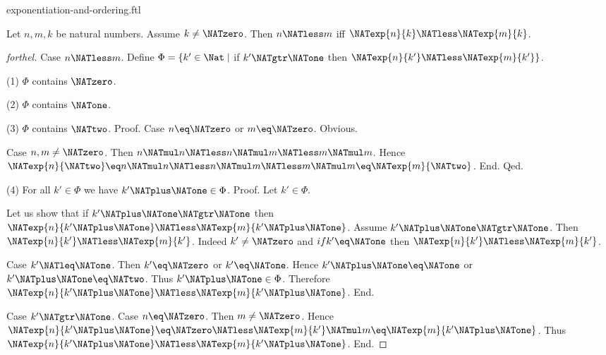 \documentclass{naproche-library}
\begin{document}
\begin{smodule}[title=Exponentiation and Ordering]{exponentiation-and-ordering.ftl}

\begin{proposition}[forthel,id=ARITHMETIC_09_3373702288769024]
  Let $n, m, k$ be natural numbers.
  Assume $k \neq \NATzero$.
  Then $n \NATless m$ iff $\NATexp{n}{k} \NATless \NATexp{m}{k}$.
\end{proposition}
\begin{proof}[forthel]
  Case $n \NATless m$.
    Define $\Phi = \{ k' \in \Nat \mid$ if $k' \NATgtr \NATone$ then $\NATexp{n}{k'} \NATless \NATexp{m}{k'} \}$.

    (1) $\Phi$ contains $\NATzero$.

    (2) $\Phi$ contains $\NATone$.

    (3) $\Phi$ contains $\NATtwo$. \newline
    Proof.
      Case $n \eq \NATzero$ or $m \eq \NATzero$. Obvious.

      Case $n, m \neq \NATzero$.
        Then $n \NATmul n
          \NATless n \NATmul m
          \NATless m \NATmul m$.
        Hence $\NATexp{n}{\NATtwo}
          \eq n \NATmul n
          \NATless n \NATmul m
          \NATless m \NATmul m
          \eq \NATexp{m}{\NATtwo}$.
      End.
    Qed.

    (4) For all $k' \in \Phi$ we have $k' \NATplus \NATone \in \Phi$. \newline
    Proof.
      Let $k' \in \Phi$.

      Let us show that if $k' \NATplus \NATone \NATgtr \NATone$ then $\NATexp{n}{k' \NATplus \NATone} \NATless \NATexp{m}{k' \NATplus \NATone}$.
        Assume $k' \NATplus \NATone \NATgtr \NATone$.
        Then $\NATexp{n}{k'} \NATless \NATexp{m}{k'}$.
        Indeed $k' \neq \NATzero$ and $if k' \eq \NATone$ then $\NATexp{n}{k'} \NATless \NATexp{m}{k'}$.

        Case $k' \NATleq \NATone$.
          Then $k' \eq \NATzero$ or $k' \eq \NATone$.
          Hence $k' \NATplus \NATone \eq \NATone$ or $k' \NATplus \NATone \eq \NATtwo$.
          Thus $k' \NATplus \NATone \in \Phi$.
          Therefore $\NATexp{n}{k' \NATplus \NATone} \NATless \NATexp{m}{k' \NATplus \NATone}$.
        End.

        Case $k' \NATgtr \NATone$.
          Case $n \eq \NATzero$.
            Then $m \neq \NATzero$.
            Hence $\NATexp{n}{k' \NATplus \NATone}
              \eq \NATzero
              \NATless \NATexp{m}{k'} \NATmul m
              \eq \NATexp{m}{k' \NATplus \NATone}$.
            Thus $\NATexp{n}{k' \NATplus \NATone} \NATless \NATexp{m}{k' \NATplus \NATone}$.
          End.


\end{proof}
\end{smodule}
\end{document}
